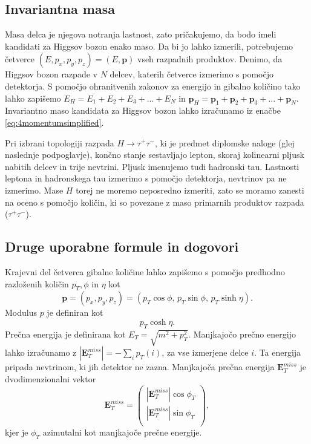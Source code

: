 \documentclass[11pt,a4paper,openany]{book}
\begin{document}
\subsection{Invariantna masa}
Masa delca je njegova notranja lastnost, zato pričakujemo, da bodo imeli kandidati za Higgsov bozon enako maso. Da bi jo lahko izmerili, potrebujemo četverce $(E, p_x, p_y, p_z) = (E, \mathbf{p})$ vseh razpadnih produktov. Denimo, da Higgsov bozon razpade v $N$ delcev, katerih četverce izmerimo s pomočjo detektorja. S pomočjo ohranitvenih zakonov za energijo in gibalno količino tako lahko zapišemo $E_H = E_1 + E_2 + E_3 + ... + E_N$ in $\mathbf{p}_H = \mathbf{p}_1 + \mathbf{p}_2 + \mathbf{p}_3 + ... + \mathbf{p}_N$. Invariantno maso kandidata za Higgsov bozon lahko izračunamo iz enačbe \ref{eq:4momentumsimplified}.

Pri izbrani topologiji razpada $H \rightarrow \tau^+\tau^-$, ki je predmet diplomske naloge (glej naslednje podpoglavje), končno stanje sestavljajo lepton, skoraj kolinearni pljusk nabitih delcev in trije nevtrini. Pljusk imenujemo tudi hadronski tau. Lastnosti leptona in hadronskega tau izmerimo s pomočjo detektorja, nevtrinov pa ne izmerimo. Mase $H$ torej ne moremo neposredno izmeriti, zato se moramo zanesti na oceno s pomočjo količin, ki so povezane z maso primarnih produktov razpada ($\tau^+\tau^-$).

\subsection{Druge uporabne formule in dogovori}

\noindent Krajevni del četverca gibalne količine lahko zapišemo s pomočjo predhodno razloženih količin $p_T, \phi$ in $\eta$ kot
\begin{equation}
\mathbf{p} = \left(p_x, p_y, p_z\right) = \left(p_T \cos \phi,\,p_T \sin \phi,\,p_T \sinh \eta\right).
\label{eq:momentum}
\end{equation}
Modulus $p$ je definiran kot
\begin{equation}
p_T \cosh \eta.
\label{eq:modulus}
\end{equation}
Prečna energija je definirana kot $E_T = \sqrt{m^2 + p_T^2}$. Manjkajočo prečno energijo lahko izračunamo z $|\textbf{E}^{miss}_T| = - \sum_i p_T(i)$, za vse izmerjene delce $i$. Ta energija pripada nevtrinom, ki jih detektor ne zazna. Manjkajoča prečna energija $\mathbf{E}^{miss}_T$ je dvodimenzionalni vektor
\begin{equation}
\mathbf{E}^{miss}_T = \left(
\begin{array}{c}
|\mathbf{E}^{miss}_T| \cos \phi_T \\
|\mathbf{E}^{miss}_T| \sin \phi_T \\
\end{array}
\right),
\label{eq:emisst}
\end{equation}
kjer je $\phi_T$ azimutalni kot manjkajoče prečne energije.
\end{document}
